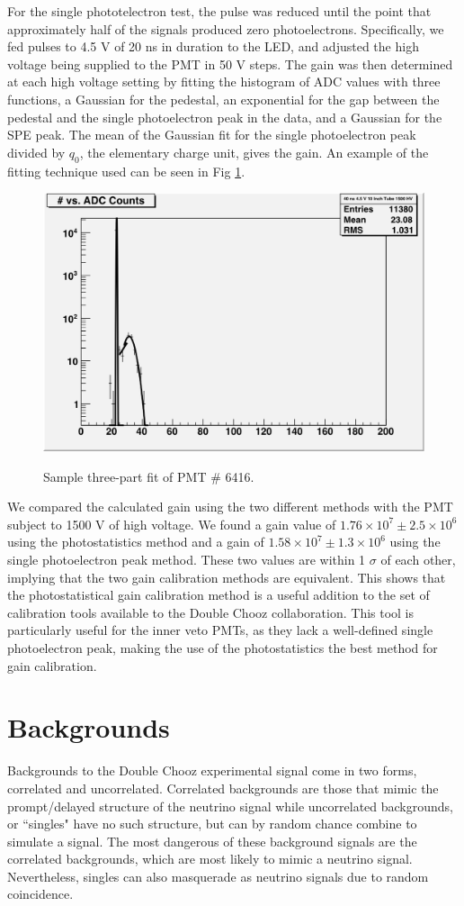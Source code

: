 For the single phototelectron test, the pulse was reduced until the point that approximately half of the signals produced zero photoelectrons. Specifically, we fed pulses to 4.5 V of 20 ns in duration to the LED, and adjusted the high voltage being supplied to the PMT in 50 V steps.  The gain was then determined at each high voltage setting by fitting the histogram of ADC values with three functions, a Gaussian for the pedestal, an exponential for the gap between the pedestal and the single photoelectron peak in the data, and a Gaussian for the SPE peak. The mean of the Gaussian fit for the single photoelectron peak divided by $q_0$, the elementary charge unit, gives the gain. An example of the fitting technique used can be seen in Fig \ref{SPE Fit}.

\begin{figure}
\caption{Sample three-part fit of PMT \# 6416.}
\includegraphics[width=.5 \textwidth]{DC_Results/SPE_Fit.jpg}
\label{SPE Fit}
\end{figure}

We compared the calculated gain using the two different methods with the PMT subject to 1500 V of high voltage. We found a gain value of $1.76 \times10^7 \pm 2.5 \times10^6$ using the photostatistics method and a gain of $1.58\times10^7 \pm1.3 \times10^6$ using the single photoelectron peak method. These two values are within 1 $\sigma$ of each other, implying that the two gain calibration methods are equivalent. This shows that the photostatistical gain calibration method is a useful addition to the set of calibration tools available to the Double Chooz collaboration. This tool is particularly useful for the inner veto PMTs, as they lack a well-defined single photoelectron peak, making the use of the photostatistics the best method for gain calibration. 

\section{Backgrounds}
\label{sec:Backgrounds}
Backgrounds to the Double Chooz experimental signal come in two forms, correlated and uncorrelated. Correlated backgrounds are those that mimic the prompt/delayed structure of the neutrino signal while uncorrelated backgrounds, or ``singles" have no such structure, but can by random chance combine to simulate a signal. The most dangerous of these background signals are the correlated backgrounds, which are most likely to mimic a neutrino signal. Nevertheless, singles can also masquerade as neutrino signals due to random coincidence.

